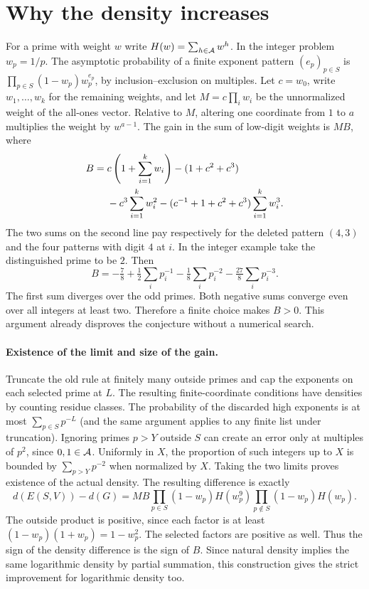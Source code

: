 \section{Why the density increases}
For a prime with weight $w$ write $H(w)=\sum_{h\in\mathcal A}w^h$. In the integer problem $w_p=1/p$. The asymptotic probability of a finite exponent pattern $(e_p)_{p\in S}$ is $\prod_{p\in S}(1-w_p)w_p^{e_p}$, by inclusion--exclusion on multiples. Let $c=w_0$, write $w_1,\ldots,w_k$ for the remaining weights, and let $M=c\prod_i w_i$ be the unnormalized weight of the all-ones vector. Relative to $M$, altering one coordinate from $1$ to $a$ multiplies the weight by $w^{a-1}$. The gain in the sum of low-digit weights is $M B$, where
\begin{align}
 B={}&c\left(1+\sum_{i=1}^k w_i\right)-(1+c^2+c^3)\notag\\
    &-c^3\sum_{i=1}^k w_i^2
       -(c^{-1}+1+c^2+c^3)\sum_{i=1}^k w_i^3.                 \label{eq:weight}
\end{align}
The two sums on the second line pay respectively for the deleted pattern $(4,3)$ and the four patterns with digit $4$ at $i$. In the integer example take the distinguished prime to be $2$. Then
\begin{equation}\label{eq:odd}
 B=-\tfrac78+\tfrac12\sum_i p_i^{-1}
             -\tfrac18\sum_i p_i^{-2}-\tfrac{27}{8}\sum_i p_i^{-3}.
\end{equation}
The first sum diverges over the odd primes. Both negative sums converge even over all integers at least two. Therefore a finite choice makes $B>0$. This argument already disproves the conjecture without a numerical search.

\paragraph{Existence of the limit and size of the gain.}
Truncate the old rule at finitely many outside primes and cap the exponents on each selected prime at $L$. The resulting finite-coordinate conditions have densities by counting residue classes. The probability of the discarded high exponents is at most $\sum_{p\in S}p^{-L}$ (and the same argument applies to any finite list under truncation). Ignoring primes $p>Y$ outside $S$ can create an error only at multiples of $p^2$, since $0,1\in\mathcal A$. Uniformly in $X$, the proportion of such integers up to $X$ is bounded by $\sum_{p>Y}p^{-2}$ when normalized by $X$. Taking the two limits proves existence of the actual density. The resulting difference is exactly
\begin{equation}\label{eq:delta}
 d(E(S,V))-d(G)=M B
 \prod_{p\in S}(1-w_p)H(w_p^9)
 \prod_{p\notin S}(1-w_p)H(w_p).
\end{equation}
The outside product is positive, since each factor is at least $(1-w_p)(1+w_p)=1-w_p^2$. The selected factors are positive as well. Thus the sign of the density difference is the sign of $B$. Since natural density implies the same logarithmic density by partial summation, this construction gives the strict improvement for logarithmic density too.

